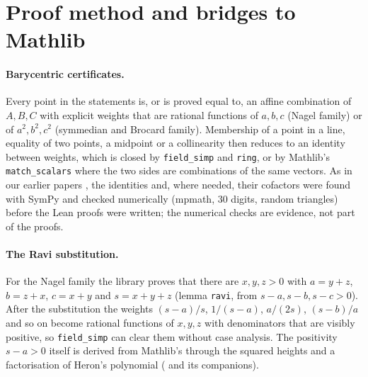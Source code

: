 \documentclass[11pt]{article}
\theoremstyle{definition}
\theoremstyle{remark}
\newcommand{\lean}[1]{\texttt{#1}}
\begin{document}
\section{Proof method and bridges to Mathlib}\label{sec:method}
\paragraph{Barycentric certificates.} Every point in the statements is, or is proved equal to, an
affine combination of $A,B,C$ with explicit weights that are rational functions of $a,b,c$ (Nagel
family) or of $a^2,b^2,c^2$ (symmedian and Brocard family). Membership of a point in a line, equality
of two points, a midpoint or a collinearity then reduces to an identity between weights, which is
closed by \lean{field\_simp} and \lean{ring}, or by Mathlib's \lean{match\_scalars} where the two sides
are combinations of the same vectors. As in our earlier papers \cite{paperA,paperE}, the identities
and, where needed, their cofactors were found with SymPy and checked numerically (mpmath, 30 digits,
random triangles) before the Lean proofs were written; the numerical checks are evidence, not part of
the proofs.

\paragraph{The Ravi substitution.} For the Nagel family the library proves that there are $x,y,z>0$
with $a=y+z$, $b=z+x$, $c=x+y$ and $s=x+y+z$ (lemma \lean{ravi}, from $s-a,s-b,s-c>0$). After the
substitution the weights $(s-a)/s$, $1/(s-a)$, $a/(2s)$, $(s-b)/a$ and so on become rational functions
of $x,y,z$ with denominators that are visibly positive, so \lean{field\_simp} can clear them without
case analysis. The positivity $s-a>0$ itself is derived from Mathlib's 
through the squared heights and a factorisation of Heron's polynomial
( and its companions).
\end{document}

